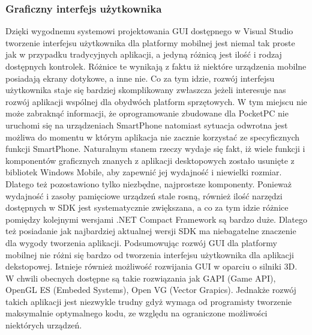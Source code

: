\subsubsection{Graficzny interfejs użytkownika}
Dzięki wygodnemu systemowi projektowania GUI
dostępnego w Visual Studio tworzenie interfejsu
użytkownika dla platformy mobilnej jest niemal tak proste jak w przypadku
tradycyjnych aplikacji, a jedyną różnicą jest ilość i rodzaj dostępnych
kontrolek. Różnice te wynikają z faktu iż niektóre urządzenia mobilne posiadają
ekrany dotykowe, a inne nie. Co za tym idzie, rozwój interfejsu użytkownika
staje się bardziej skomplikowany zwłaszcza jeżeli interesuje nas rozwój
aplikacji wspólnej dla obydwóch platform sprzętowych. W tym miejscu nie może
zabraknąć informacji, że oprogramowanie zbudowane dla PocketPC nie uruchomi się
na urządzeniach SmartPhone natomiast sytuacja odwrotna jest możliwa do momentu w
którym aplikacja nie zacznie korzystać ze specyficznych funkcji SmartPhone.
Naturalnym stanem rzeczy wydaje się fakt, iż wiele funkcji i komponentów
graficznych znanych z aplikacji desktopowych zostało usunięte z bibliotek
Windows Mobile, aby zapewnić jej wydajność i niewielki rozmiar. Dlatego też
pozostawiono tylko niezbędne, najprostsze komponenty. Ponieważ wydajność  i
zasoby pamięciowe urządzeń stale rosną, również ilość narzędzi dostępnych w SDK
jest systematycznie zwiększana, a co za tym idzie różnice pomiędzy kolejnymi
wersjami .NET Compact Framework są bardzo duże. Dlatego też posiadanie jak
najbardziej aktualnej wersji SDK ma niebagatelne znaczenie dla wygody tworzenia
aplikacji. Podsumowując rozwój GUI dla platformy mobilnej nie różni się bardzo
od tworzenia interfejsu użytkownika dla aplikacji dekstopowej. Istnieje również
możliwość rozwijania GUI w oparciu o silniki 3D. W chwili obecnych dostępne są
takie rozwiązania jak GAPI (Game API), OpenGL ES (Embeded Systems), Open VG
(Vector Grapics). Jednakże rozwój takich aplikacji jest niezwykle trudny gdyż
wymaga od programisty tworzenie maksymalnie optymalnego kodu, ze względu na
ograniczone możliwości niektórych urządzeń. 

